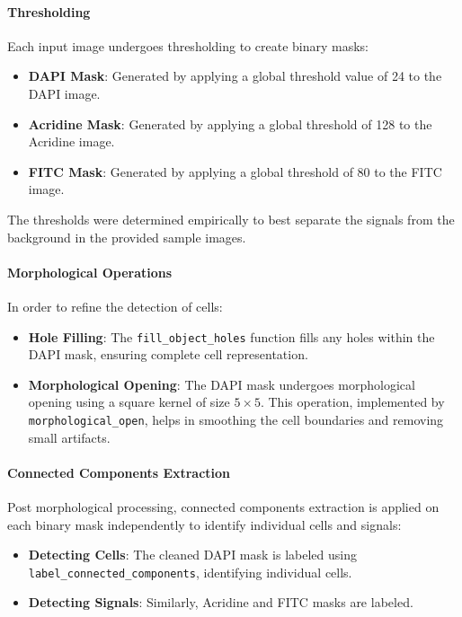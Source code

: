 \documentclass[a4paper,12pt]{article}
\begin{document}
\paragraph{Thresholding}

Each input image undergoes thresholding to create binary masks:
\begin{itemize}
    \item \textbf{DAPI Mask}: Generated by applying a global threshold value of 24 to the DAPI image.
    \item \textbf{Acridine Mask}: Generated by applying a global threshold of 128 to the Acridine image.
    \item \textbf{FITC Mask}: Generated by applying a global threshold of 80 to the FITC image.
\end{itemize}

The thresholds were determined empirically to best separate the signals from the background in the provided sample images.

\paragraph{Morphological Operations}

In order to refine the detection of cells:
\begin{itemize}
    \item \textbf{Hole Filling}: The \texttt{fill\_object\_holes} function fills any holes within the DAPI mask, ensuring complete cell representation.
    \item \textbf{Morphological Opening}: The DAPI mask undergoes morphological opening using a square kernel of size \(5 \times 5\). This operation, implemented by \texttt{morphological\_open}, helps in smoothing the cell boundaries and removing small artifacts.
\end{itemize}

\paragraph{Connected Components Extraction}

Post morphological processing, connected components extraction is applied on each binary mask independently to identify individual cells and signals:
\begin{itemize}
    \item \textbf{Detecting Cells}: The cleaned DAPI mask is labeled using \texttt{label\_connected\_components}, identifying individual cells.
    \item \textbf{Detecting Signals}: Similarly, Acridine and FITC masks are labeled.
\end{itemize}
\end{document}
